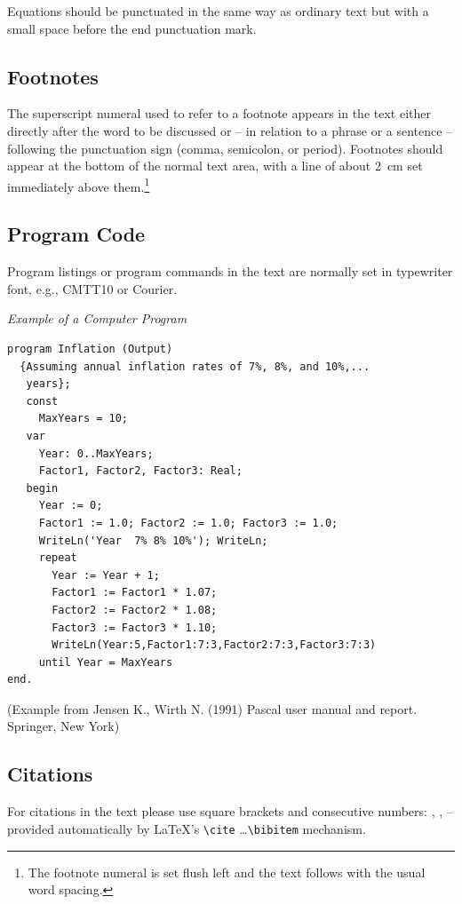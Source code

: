 \documentclass[runningheads,a4paper]{llncs}
\begin{document}
Equations should be punctuated in the same way as ordinary
text but with a small space before the end punctuation mark.

\subsection{Footnotes}

The superscript numeral used to refer to a footnote appears in the text
either directly after the word to be discussed or -- in relation to a
phrase or a sentence -- following the punctuation sign (comma,
semicolon, or period). Footnotes should appear at the bottom of
the
normal text area, with a line of about 2~cm set
immediately above them.\footnote{The footnote numeral is set flush left
and the text follows with the usual word spacing.}

\subsection{Program Code}

Program listings or program commands in the text are normally set in
typewriter font, e.g., CMTT10 or Courier.

\medskip

\noindent
{\it Example of a Computer Program}
\begin{verbatim}
program Inflation (Output)
  {Assuming annual inflation rates of 7%, 8%, and 10%,...
   years};
   const
     MaxYears = 10;
   var
     Year: 0..MaxYears;
     Factor1, Factor2, Factor3: Real;
   begin
     Year := 0;
     Factor1 := 1.0; Factor2 := 1.0; Factor3 := 1.0;
     WriteLn('Year  7% 8% 10%'); WriteLn;
     repeat
       Year := Year + 1;
       Factor1 := Factor1 * 1.07;
       Factor2 := Factor2 * 1.08;
       Factor3 := Factor3 * 1.10;
       WriteLn(Year:5,Factor1:7:3,Factor2:7:3,Factor3:7:3)
     until Year = MaxYears
end.
\end{verbatim}
%
\noindent
{\small (Example from Jensen K., Wirth N. (1991) Pascal user manual and
report. Springer, New York)}

\subsection{Citations}

For citations in the text please use
square brackets and consecutive numbers: \cite{jour}, \cite{lncschap},
\cite{proceeding1} -- provided automatically
by \LaTeX 's \verb|\cite| \dots\verb|\bibitem| mechanism.
\end{document}
